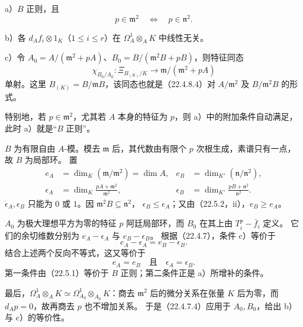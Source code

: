 \noindent a）$B$ 正则，且
\[
 p\in\mathfrak m^2\quad\Longleftrightarrow\quad p\in\mathfrak n^2.
\]

\noindent b）各 $d_Af_i\otimes1_K$（$1\le i\le r$）在 $\Omega^1_A\otimes_AK$ 中线性无关。

\noindent c）令 $A_0=A/(\mathfrak m^2+pA)$、$B_0=B/(\mathfrak m^2B+pB)$，则特征同态
\[
 \chi_{B_0/A_0}:\Xi_{B_{(K)}/K}
 \longrightarrow\mathfrak m/(\mathfrak m^2+pA)
\]
单射。这里 $B_{(K)}=B/\mathfrak mB$，该同态也就是（22.4.8.4）对 $A/\mathfrak m^2$ 及 $B/\mathfrak m^2B$ 的形式。

特别地，若 $p\in\mathfrak m^2$，尤其若 $A$ 本身的特征为 $p$，则 a）中的附加条件自动满足，此时 a）就是“$B$ 正则”。

\eproof
$B$ 为有限自由 $A$-模。模去 $\mathfrak m$ 后，其代数由有限个 $p$ 次根生成，素谱只有一点，故 $B$ 为局部环。
置
\[
 \begin{aligned}
 e_A&=\dim_K(\mathfrak m/\mathfrak m^2)=\dim A,&
 e_B&=\dim_{K'}(\mathfrak n/\mathfrak n^2),\\
 \epsilon_A&=\dim_K\frac{pA+\mathfrak m^2}{\mathfrak m^2},&
 \epsilon_B&=\dim_{K'}\frac{pB+\mathfrak n^2}{\mathfrak n^2}.
 \end{aligned}
\]
$\epsilon_A,\epsilon_B$ 只能为 $0$ 或 $1$。因 $\mathfrak m^2B\subseteq\mathfrak n^2$，
$\epsilon_B\le\epsilon_A$；又由（22.5.2，ii），$e_B\ge e_A$。

$A_0$ 为极大理想平方为零的特征 $p$ 阿廷局部环，而 $B_0$ 在其上由
$T_i^p-\bar f_i$ 定义。
它们的余切维数分别为 $e_A-\epsilon_A$ 与 $e_B-\epsilon_B$。
根据（22.4.7），条件 c）等价于
\[
 e_A-\epsilon_A=e_B-\epsilon_B.
\]
结合上述两个反向不等式，这又等价于
\[
 e_A=e_B\quad\text{且}\quad\epsilon_A=\epsilon_B.
\]
第一条件由（22.5.1）等价于 $B$ 正则；第二条件正是 a）所增补的条件。

最后，$\Omega^1_A\otimes_AK\simeq\Omega^1_{A_0}\otimes_{A_0}K$：商去 $\mathfrak m^2$ 后的微分关系在张量 $K$ 后为零，而 $d_Ap=0$，故再商去 $p$ 也不增加关系。
于是（22.4.7.4）应用于 $A_0,B_0$，给出 b）与 c）的等价性。
\finishproof
